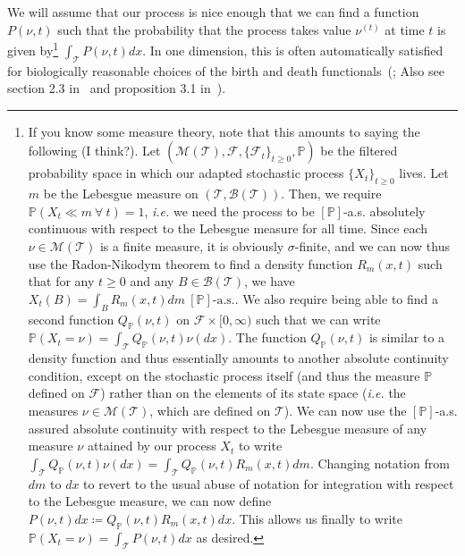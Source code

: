 We will assume that our process is nice enough that we can find a function $P(\nu,t)$ such that the probability that the process takes value $\nu^{(t)}$ at time $t$ is given by\footnote{If you know some measure theory, note that this amounts to saying the following (I think?). Let $(\mathcal{M}(\mathcal{T}), \mathscr{F}, \{\mathscr{F}_t\}_{t\geq 0}, \mathbb{P})$ be the filtered probability space in which our adapted stochastic process $\{X_t\}_{t \geq 0}$ lives. Let $m$ be the Lebesgue measure on $(\mathcal{T},\mathscr{B}(\mathcal{T}))$. Then, we require $\mathbb{P}(X_t \ll m \ \forall \ t) = 1$, \emph{i.e.} we need the process to be $[\mathbb{P}]$-a.s. absolutely continuous with respect to the Lebesgue measure for all time. Since each $\nu \in \mathcal{M}(\mathcal{T})$ is a finite measure, it is obviously $\sigma$-finite, and we can now thus use the Radon-Nikodym theorem to find a density function $R_{m}(x,t)$ such that for any $t \geq 0$ and any $B \in \mathscr{B}(\mathcal{T})$, we have $X_t(B) = \int_B R_{m}(x,t) dm \ [\mathbb{P}]\textrm{-a.s.}$. We also require being able to find a second function $Q_{\mathbb{P}}(\nu,t)$ on $\mathscr{F} \times [0,\infty)$ such that we can write $\mathbb{P}(X_t = \nu) = \int_{\mathcal{T}} Q_{\mathbb{P}}(\nu,t)\nu(dx)$. The function $Q_{\mathbb{P}}(\nu,t)$ is similar to a density function and thus essentially amounts to another absolute continuity condition, except on the stochastic process itself (and thus the measure $\mathbb{P}$ defined on $\mathscr{F}$) rather than on the elements of its state space (\emph{i.e.} the measures $\nu \in \mathcal{M}(\mathcal{T})$, which are defined on $\mathcal{T}$). We can now use the $[\mathbb{P}]$-a.s. assured absolute continuity with respect to the Lebesgue measure of any measure $\nu$ attained by our process $X_t$ to write $\int_{\mathcal{T}}Q_{\mathbb{P}}(\nu,t)\nu(dx) = \int_{\mathcal{T}}Q_{\mathbb{P}}(\nu,t)R_{m}(x,t)dm$. Changing notation from $dm$ to $dx$ to revert to the usual abuse of notation for integration with respect to the Lebesgue measure, we can now define $P(\nu,t)dx \coloneqq Q_{\mathbb{P}}(\nu,t)R_{m}(x,t)dx$. This allows us finally to write $\mathbb{P}(X_t = \nu) =  \int_{\mathcal{T}}P(\nu,t)dx$ as desired.} $\int_{\mathcal{T}}P(\nu,t)dx$. In one dimension, this is often automatically satisfied for biologically reasonable choices of the birth and death functionals~(\cite{dawson_stochastic_1975,walsh_introduction_1986,konno_stochastic_1988,reimers_one_1989,dawson_stochastic_2000}; Also see section 2.3 in~\cite{etheridge_introduction_2000} and proposition 3.1 in~\cite{champagnat_individual_2008}).

